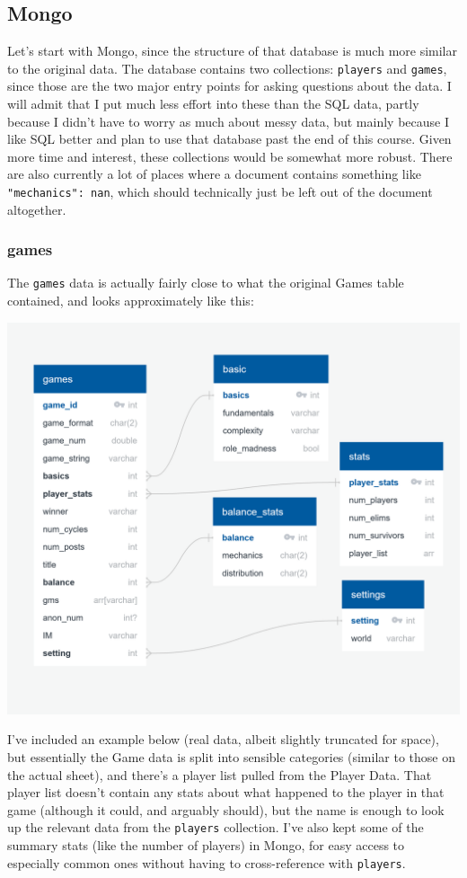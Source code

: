 \documentclass[11pt, oneside]{amsart}   	%
\begin{document}
\subsection{Mongo}

Let's start with Mongo, since the structure of that database is much more similar to the original data. The database contains two collections: \texttt{players} and \texttt{games}, since those are the two major entry points for asking questions about the data. I will admit that I put much less effort into these than the SQL data, partly because I didn't have to worry as much about messy data, but mainly because I like SQL better and plan to use that database past the end of this course. Given more time and interest, these collections would be somewhat more robust. There are also currently a lot of places where a document contains something like \texttt{"mechanics": nan}, which should technically just be left out of the document altogether. 


\subsubsection{games}
The \texttt{games} data is actually fairly close to what the original Games table contained, and looks approximately like this: 

\includegraphics[scale=0.5]{../mongo/mongo_games_v0.png}

I've included an example below (real data, albeit slightly truncated for space), but essentially the Game data is split into sensible categories (similar to those on the actual sheet), and there's a player list pulled from the Player Data. That player list doesn't contain any stats about what happened to the player in that game (although it could, and arguably should), but the name is enough to look up the relevant data from the \texttt{players} collection. I've also kept some of the summary stats (like the number of players) in Mongo, for easy access to especially common ones without having to cross-reference with \texttt{players}.
\end{document}
